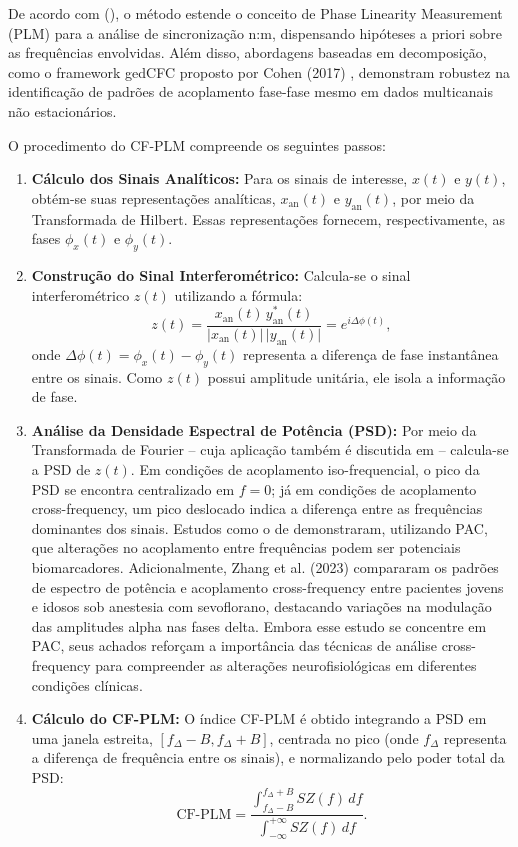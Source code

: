 De acordo com \citeauthor{sorrentino2022detection} (\citeyear{sorrentino2022detection}), o método estende o conceito de Phase Linearity Measurement (PLM) para a análise de sincronização n:m, dispensando hipóteses a priori sobre as frequências envolvidas. Além disso, abordagens baseadas em decomposição, como o framework gedCFC proposto por Cohen (2017) \cite{cohen2017multivariate}, demonstram robustez na identificação de padrões de acoplamento fase-fase mesmo em dados multicanais não estacionários.

O procedimento do CF-PLM compreende os seguintes passos:

\begin{enumerate}
    \item \textbf{Cálculo dos Sinais Analíticos:} Para os sinais de interesse, \(x(t)\) e \(y(t)\), obtém-se suas representações analíticas, \(x_{\mathrm{an}}(t)\) e \(y_{\mathrm{an}}(t)\), por meio da Transformada de Hilbert. Essas representações fornecem, respectivamente, as fases \(\phi_x(t)\) e \(\phi_y(t)\).
    \item \textbf{Construção do Sinal Interferométrico:} Calcula-se o sinal interferométrico \(z(t)\) utilizando a fórmula:
    \[
    z(t) = \frac{x_{\mathrm{an}}(t)\, y_{\mathrm{an}}^*(t)}{\lvert x_{\mathrm{an}}(t)\rvert\, \lvert y_{\mathrm{an}}(t)\rvert} = e^{i\Delta \phi(t)},
    \]
    onde \(\Delta \phi(t) = \phi_x(t) - \phi_y(t)\) representa a diferença de fase instantânea entre os sinais. Como \(z(t)\) possui amplitude unitária, ele isola a informação de fase.
    \item \textbf{Análise da Densidade Espectral de Potência (PSD):} Por meio da Transformada de Fourier -- cuja aplicação também é discutida em \cite{seraj2018cerebral} -- calcula-se a PSD de \( z(t) \). Em condições de acoplamento iso-frequencial, o pico da PSD se encontra centralizado em \(f = 0\); já em condições de acoplamento cross-frequency, um pico deslocado indica a diferença entre as frequências dominantes dos sinais. Estudos como o de \cite{chen2023multiple} demonstraram, utilizando PAC, que alterações no acoplamento entre frequências podem ser potenciais biomarcadores. Adicionalmente, Zhang et al. (2023) \cite{zhang2023differences} compararam os padrões de espectro de potência e acoplamento cross-frequency entre pacientes jovens e idosos sob anestesia com sevoflorano, destacando variações na modulação das amplitudes alpha nas fases delta. Embora esse estudo se concentre em PAC, seus achados reforçam a importância das técnicas de análise cross-frequency para compreender as alterações neurofisiológicas em diferentes condições clínicas.
    \item \textbf{Cálculo do CF-PLM:} O índice CF-PLM é obtido integrando a PSD em uma janela estreita, \([f_\Delta - B, f_\Delta + B]\), centrada no pico (onde \(f_\Delta\) representa a diferença de frequência entre os sinais), e normalizando pelo poder total da PSD:
    \[
    \text{CF-PLM} = \frac{\displaystyle\int_{f_\Delta - B}^{f_\Delta + B} SZ(f) \, df}{\displaystyle\int_{-\infty}^{+\infty} SZ(f) \, df}.
    \]
\end{enumerate}

